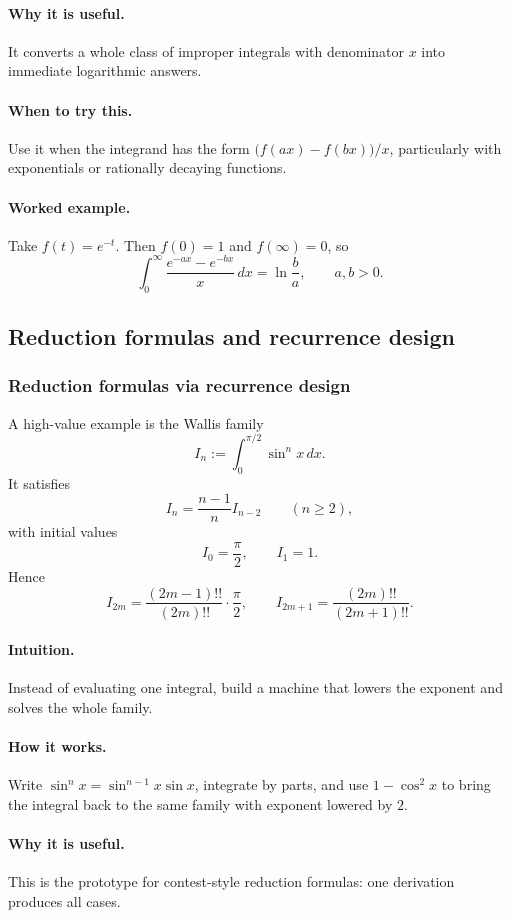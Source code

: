 \documentclass[12pt]{article}
\begin{document}
\paragraph{Why it is useful.}
It converts a whole class of improper integrals with denominator \(x\) into immediate logarithmic answers.

\paragraph{When to try this.}
Use it when the integrand has the form \(\bigl(f(ax)-f(bx)\bigr)/x\), particularly with exponentials or rationally decaying functions.

\paragraph{Worked example.}
Take \(f(t)=e^{-t}\). Then \(f(0)=1\) and \(f(\infty)=0\), so
\[
\int_0^\infty \frac{e^{-ax}-e^{-bx}}{x}\,dx
=\ln\frac{b}{a},
\qquad a,b>0.
\]

\newpage
\subsection{Reduction formulas and recurrence design}
\subsubsection{Reduction formulas via recurrence design}
A high-value example is the Wallis family
\[
I_n:=\int_0^{\pi/2}\sin^n x\,dx.
\]
It satisfies
\[
I_n=\frac{n-1}{n}I_{n-2}
\qquad (n\ge 2),
\]
with initial values
\[
I_0=\frac{\pi}{2},
\qquad
I_1=1.
\]
Hence
\[
I_{2m}=\frac{(2m-1)!!}{(2m)!!}\cdot \frac{\pi}{2},
\qquad
I_{2m+1}=\frac{(2m)!!}{(2m+1)!!}.
\]

\paragraph{Intuition.}
Instead of evaluating one integral, build a machine that lowers the exponent and solves the whole family.

\paragraph{How it works.}
Write \(\sin^n x=\sin^{n-1}x\sin x\), integrate by parts, and use \(1-\cos^2x\) to bring the integral back to the same family with exponent lowered by \(2\).

\paragraph{Why it is useful.}
This is the prototype for contest-style reduction formulas: one derivation produces all cases.
\end{document}

